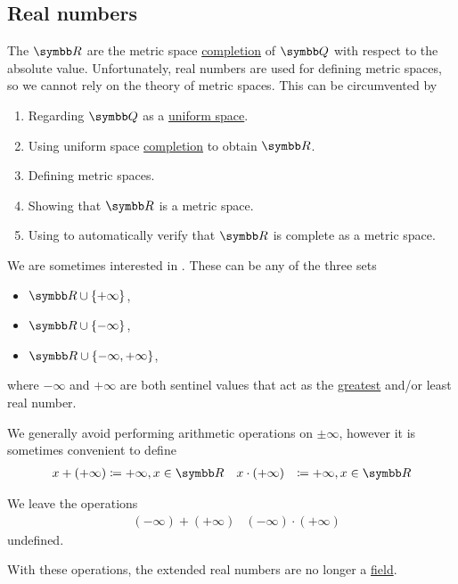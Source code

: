 \subsection{Real numbers}\label{subsec:real_numbers}

\begin{definition}\label{def:real_numbers}
  The  \( \BR \) are the metric space \hyperref[def:complete_metric_space]{completion} of \( \BQ \) with respect to the absolute value. Unfortunately, real numbers are used for defining metric spaces, so we cannot rely on the theory of metric spaces. This can be circumvented by
  \begin{enumerate}
    \item Regarding \( \BQ \) as a \hyperref[def:uniform_space]{uniform space}.
    \item Using uniform space \hyperref[thm:uniform_space_completion]{completion} to obtain \( \BR \).
    \item Defining metric spaces.
    \item Showing that \( \BR \) is a metric space.
    \item Using  to automatically verify that \( \BR \) is complete as a metric space.
  \end{enumerate}
\end{definition}

\begin{definition}\label{def:extended_real_numbers}
  We are sometimes interested in . These can be any of the three sets
  \begin{itemize}
    \item \( \BR \cup \{ +\infty \} \),
    \item \( \BR \cup \{ -\infty \} \),
    \item \( \BR \cup \{ -\infty, +\infty \} \),
  \end{itemize}
  where \( -\infty \) and \( +\infty \) are both sentinel values that act as the \hyperref[def:preordered_set/largest_smallest_element]{greatest} and/or least real number.

  We generally avoid performing arithmetic operations on \( \pm \infty \), however it is sometimes convenient to define
  \begin{align*}
    x + (+\infty)     & \coloneqq +\infty, x \in \BR
                      &                              &
    x \cdot (+\infty) & \coloneqq +\infty, x \in \BR
  \end{align*}

  We leave the operations
  \begin{align*}
     & (-\infty) + (+\infty)
     & (-\infty) \cdot (+\infty)
  \end{align*}
  undefined.

  With these operations, the extended real numbers are no longer a \hyperref[def:field]{field}.
\end{definition}

